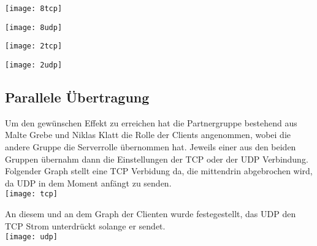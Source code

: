 \documentclass{scrartcl}
\begin{document}
    \texttt{[image: 8tcp]}
    \label{fig:8tcp}
    
        \texttt{[image: 8udp]}
    \label{fig:8udp}
    
        \texttt{[image: 2tcp]}
    \label{fig:2tcp}
    
        \texttt{[image: 2udp]}
    \label{fig:2udp}
   
   \newpage
      \subsection[Aufgabe 9 Paralllele Übertragung]{Parallele Übertragung}

	Um den gewünschen Effekt zu erreichen hat die Partnergruppe bestehend aus Malte Grebe und Niklas Klatt die Rolle der Clients angenommen, wobei die andere Gruppe die Serverrolle übernommen hat. Jeweils einer aus den beiden Gruppen übernahm dann die Einstellungen der TCP oder der UDP Verbindung.\\
      Folgender Graph stellt eine TCP Verbidung da, die mittendrin abgebrochen wird, da UDP in dem Moment anfängt zu senden.\\    
      \texttt{[image: tcp]}
   \label{fig:tcp}
      
      An diesem und an dem Graph der Clienten wurde festegestellt, das UDP den TCP Strom unterdrückt solange er sendet.\\    
      \texttt{[image: udp]}
   \label{fig:udp}

      
      
      
\end{document}
